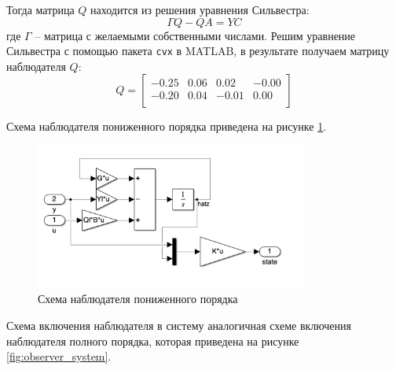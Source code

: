 Тогда матрица $Q$ находится из решения уравнения Сильвестра: 
\begin{equation}
   \Gamma Q - QA = YC 
\end{equation}
где $\Gamma$ -- матрица с желаемыми собственными числами. 
Решим уравнение Сильвестра с помощью пакета \texttt{cvx} в MATLAB, в результате получаем матрицу наблюдателя $Q$:
\begin{equation}
    Q = \begin{bmatrix}
    -0.25  & 0.06  & 0.02  & -0.00 \\ 
    -0.20  & 0.04  & -0.01  & 0.00 \\
    \end{bmatrix}
\end{equation}

Схема наблюдателя пониженного порядка приведена на рисунке \ref{fig:reduced_observer_scheme}.
\begin{figure}[ht!]
    \centering
    \includegraphics[width=0.8\textwidth]{media/reduced_observer_scheme.png}
    \caption{Схема наблюдателя пониженного порядка}
    \label{fig:reduced_observer_scheme}
\end{figure}

Схема включения наблюдателя в систему аналогичная схеме включения наблюдателя полного порядка, 
которая приведена на рисунке \ref{fig:observer_system}. 

